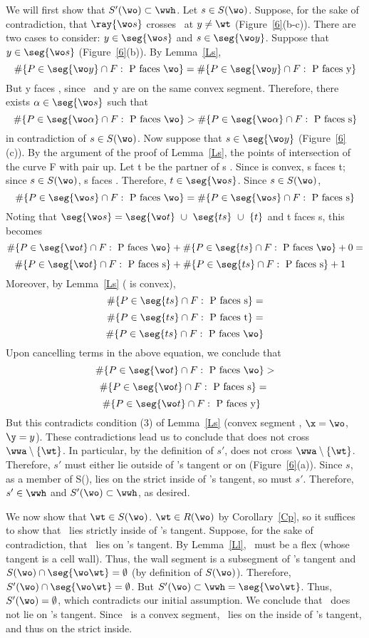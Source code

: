 We will first show that $S'(\wo) \subset \wwh$. Let $s \in S(\wo)$.
Suppose, for the sake of contradiction, that $\ray{\wo s}$ crosses \wwa\
at $y \neq \wt$ (Figure~\ref{6}(b-c)).
There are two cases to consider: $y \in \seg{\wo s}$ and $s \in \seg{\wo y}$.
Suppose that $y \in \seg{\wo s}$ (Figure~\ref{6}(b)).
By Lemma~\ref{Ls}, 
\[ \#\{P \in \seg{\wo y} \cap F: \mbox{ P faces \wo}\} = 
\#\{P \in \seg{\wo y} \cap F: \mbox{ P faces y}\} \]
But y faces \wo, since \wo\ and y are on the same convex segment.
Therefore, there exists $\alpha \in \seg{\wo s}$ such that
\[ \#\{P \in \seg{\wo\alpha} \cap F: \mbox{ P faces \wo}\} 
> \#\{P \in \seg{\wo\alpha} \cap F: \mbox{ P faces s}\} \]
in contradiction of $s \in S(\wo)$.
Now suppose that $s \in \seg{\wo y}$ (Figure~\ref{6}(c)).
By the argument of the proof of Lemma~\ref{Ls}, the
points of intersection of the curve F with  pair up.
Let t be the partner of s .
Since  is convex, s faces t; since $s \in S(\wo)$, s faces \wo. 
Therefore, $t \in \seg{\wo s}$.
Since \mbox{$s \in S(\wo)$}, 
\[ \#\{P \in \seg{\wo s} \cap F: \mbox{ P faces \wo}\}
= \#\{P \in \seg{\wo s} \cap F: \mbox{ P faces s}\} \]
Noting that $\seg{\wo s} = \seg{\wo t}\ \cup\ \seg{ts}\ \cup\ \{t\}$ and 
t faces s, this becomes 
\[ \#\{P \in \seg{\wo t} \cap F: \mbox{ P faces \wo}\} +
\#\{P \in \seg{ts} \cap F: \mbox{ P faces \wo}\} + 0 =  \]
\nopagebreak
\[ \#\{P \in \seg{\wo t} \cap F: \mbox{ P faces s}\} +
\#\{P \in \seg{ts} \cap F: \mbox{ P faces s}\} + 1\ \ \  \]
Moreover, by Lemma~\ref{Ls} ( is convex),
\[ \#\{P \in \seg{ts} \cap F: \mbox{ P faces s}\} = \]
\[ \#\{P \in \seg{ts} \cap F: \mbox{ P faces t}\} = \]
\[ \#\{P \in \seg{ts} \cap F: \mbox{ P faces \wo} \} \]
Upon cancelling terms in the above equation, we conclude that
\[ \#\{P \in \seg{\wo t} \cap F: \mbox{ P faces \wo}\} > \]
\[ \#\{P \in \seg{\wo t} \cap F: \mbox{ P faces s}\} =\  \]
\[ \#\{P \in \seg{\wo t} \cap F: \mbox{ P faces y}\}\ \  \]
But this contradicts condition (3) of Lemma~\ref{Ls} 
(convex segment \wwa, $\x = \wo$, $\y = y$).
These contradictions lead us to conclude that  does not cross 
$\wwa \setminus \{\wt\}$.
In particular, by the definition of $s'$, 
 does not cross $\wwa \setminus \{\wt\}$.
Therefore, $s'$ must either lie outside of \wo's tangent or on \wwh (Figure~\ref{6}(a)).
Since $s$, as a member of S(\wo), lies on the strict inside of \wo's tangent,
so must $s'$.
Therefore, $s' \in \wwh$ and $S'(\wo) \subset \wwh$, as desired.

We now show that $\wt \in S(\wo)$.
$\wt \in R(\wo)$ by Corollary~\ref{Cp},
so it suffices to show that \wt\ lies strictly inside of \wo's tangent.
Suppose, for the sake of contradiction, that \wt\ lies on \wo's tangent.
By Lemma~\ref{Ll}, \wo\ must be a flex (whose tangent is a cell wall).
Thus, the wall segment \seg{\wo\wt} is a subsegment of \wo's tangent and
\mbox{$S(\wo) \cap \seg{\wo\wt} = \emptyset$} (by definition of $S(\wo)$).
Therefore, \mbox{$S'(\wo) \cap \seg{\wo\wt} = \emptyset$}.
But $S'(\wo) \subset \wwh = \seg{\wo\wt}$.
Thus, $S'(\wo) = \emptyset$, which contradicts our initial assumption.
We conclude that \wt\ does not lie on \wo's tangent.
Since \wwa\ is a convex segment, \wt\ lies on the inside of \wo's 
tangent, and thus on the strict inside.

